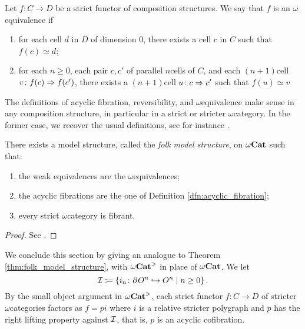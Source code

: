 \begin{dfn} 
    Let \( f \colon C \to D \) be a strict functor of composition structures.
    We say that \( f \) is an \( \omega \)\nbd equivalence if
    \begin{enumerate}
        \item for each cell \( d \) in \( D \) of dimension \( 0 \), there exists a cell \( c \) in \( C \) such that \( f(c) \simeq d \);
        \item for each \( n \geq 0 \), each pair \( c, c' \) of parallel \( n \)\nbd cells of \( C \), and each \( (n + 1) \)\nbd cell \( v \colon f(c) \Rightarrow f(c') \), there exists a \( (n + 1) \)\nbd cell \( u \colon c \Rightarrow c' \) such that \( f(u) \simeq v \)
    \end{enumerate}
\end{dfn}

\begin{comm}
    The definitions of acyclic fibration, reversibility, and \( \omega \)\nbd equivalence make sense in any composition structure, in particular in a strict or stricter \( \omega \)\nbd category.
    In the former case, we recover the usual definitions, see for instance \cite[19.2.3, 20.1.1, 20.1.11]{ara2025polygraphs}.
\end{comm}

\begin{thm} \label{thm:folk_model_structure}
    There exists a model structure, called the \emph{folk model structure}, on \( {\omega\mathbf{Cat}} \) such that:
    \begin{enumerate}
        \item the weak equivalences are the \( \omega \)\nbd equivalences;
        \item the acyclic fibrations are the one of Definition \ref{dfn:acyclic_fibration};
        \item every strict \( \omega \)\nbd category is fibrant. 
    \end{enumerate} 
\end{thm}
\begin{proof} 
    See \cite{lafont2010folk}.
\end{proof}

\noindent We conclude this section by giving an analogue to Theorem \ref{thm:folk_model_structure}, with \( {\omega\mathbf{Cat}}^> \) in place of \( {\omega\mathbf{Cat}} \).
We let 
\begin{equation*}
    \mathcal{I} \coloneqq \left\{ {i_n \colon \partial_{}^{} O^{n} \hookrightarrow O^{n} \mid n \geq 0} \right\}.
\end{equation*}
By the small object argument in \( {\omega\mathbf{Cat}}^> \), each strict functor \( f \colon C \to D \) of stricter \( \omega \)\nbd categories factors as \( f = p i \) where \( i \) is a relative stricter polygraph and \( p \) has the right lifting property against \( \mathcal{I} \), that is, \( p \) is an acyclic cofibration.

